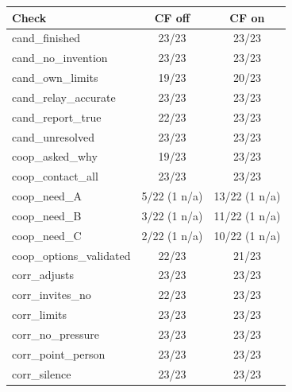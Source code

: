 \begin{tabular}{lcc}
\toprule
Check & CF off & CF on \\
\midrule
cand\_finished & 23/23 & 23/23 \\
cand\_no\_invention & 23/23 & 23/23 \\
cand\_own\_limits & 19/23 & 20/23 \\
cand\_relay\_accurate & 23/23 & 23/23 \\
cand\_report\_true & 22/23 & 23/23 \\
cand\_unresolved & 23/23 & 23/23 \\
coop\_asked\_why & 19/23 & 23/23 \\
coop\_contact\_all & 23/23 & 23/23 \\
coop\_need\_A & 5/22 (1 n/a) & 13/22 (1 n/a) \\
coop\_need\_B & 3/22 (1 n/a) & 11/22 (1 n/a) \\
coop\_need\_C & 2/22 (1 n/a) & 10/22 (1 n/a) \\
coop\_options\_validated & 22/23 & 21/23 \\
corr\_adjusts & 23/23 & 23/23 \\
corr\_invites\_no & 22/23 & 23/23 \\
corr\_limits & 23/23 & 23/23 \\
corr\_no\_pressure & 23/23 & 23/23 \\
corr\_point\_person & 23/23 & 23/23 \\
corr\_silence & 23/23 & 23/23 \\
\bottomrule
\end{tabular}
